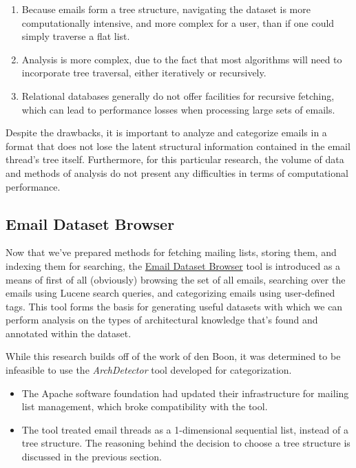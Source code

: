 \documentclass[a4paper, 12pt]{article}
\begin{document}
		\begin{enumerate}
			\item Because emails form a tree structure, navigating the dataset is more computationally intensive, and more complex for a user, than if one could simply traverse a flat list.
			\item Analysis is more complex, due to the fact that most algorithms will need to incorporate tree traversal, either iteratively or recursively.
			\item Relational databases generally do not offer facilities for recursive fetching, which can lead to performance losses when processing large sets of emails.
		\end{enumerate}
	
		Despite the drawbacks, it is important to analyze and categorize emails in a format that does not lose the latent structural information contained in the email thread's tree itself. Furthermore, for this particular research, the volume of data and methods of analysis do not present any difficulties in terms of computational performance.
	
	\subsection{Email Dataset Browser}
		Now that we've prepared methods for fetching mailing lists, storing them, and indexing them for searching, the \href{https://github.com/ArchitecturalKnowledgeAnalysis/EmailDatasetBrowser}{Email Dataset Browser} tool is introduced as a means of first of all (obviously) browsing the set of all emails, searching over the emails using Lucene search queries, and categorizing emails using user-defined tags. This tool forms the basis for generating useful datasets with which we can perform analysis on the types of architectural knowledge that's found and annotated within the dataset.
		
		While this research builds off of the work of den Boon\cite{denboon}, it was determined to be infeasible to use the \textit{ArchDetector} tool developed for categorization.
		
		\begin{itemize}
			\item The Apache software foundation had updated their infrastructure for mailing list management, which broke compatibility with the tool.
			\item The tool treated email threads as a 1-dimensional sequential list, instead of a tree structure. The reasoning behind the decision to choose a tree structure is discussed in the previous section.
		\end{itemize}
	
\end{document}
